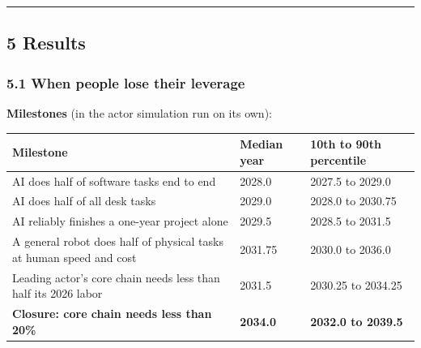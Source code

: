 \documentclass[
  10pt,
]{article}
\newcounter{none} %
\begin{document}
\begin{center}\rule{0.5\linewidth}{0.5pt}\end{center}

\subsection{5 Results}\label{results}

\subsubsection{5.1 When people lose their leverage}\label{when-people-lose-their-leverage}

\textbf{Milestones} (in the actor simulation run on its own):

{\def\LTcaptype{none} %
\begin{longtable}[]{@{}lll@{}}
\toprule\noalign{}
Milestone & Median year & 10th to 90th percentile \\
\midrule\noalign{}
\endhead
\bottomrule\noalign{}
\endlastfoot
AI does half of software tasks end to end & 2028.0 & 2027.5 to 2029.0 \\
AI does half of all desk tasks & 2029.0 & 2028.0 to 2030.75 \\
AI reliably finishes a one-year project alone & 2029.5 & 2028.5 to 2031.5 \\
A general robot does half of physical tasks at human speed and cost & 2031.75 & 2030.0 to 2036.0 \\
Leading actor's core chain needs less than half its 2026 labor & 2031.5 & 2030.25 to 2034.25 \\
\textbf{Closure: core chain needs less than 20\%} & \textbf{2034.0} & \textbf{2032.0 to 2039.5} \\
\end{longtable}
}
\end{document}
